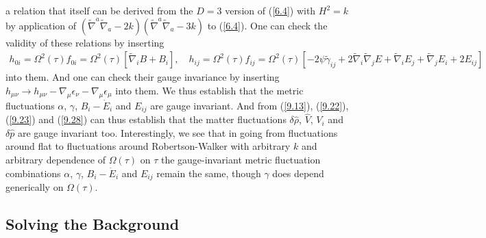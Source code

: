 \documentclass[aps,onecolumn,10pt]{revtex4}
\numberwithin{equation}{section}
\numberwithin{equation}{section}
\begin{document}
%
a relation that itself can be  derived from the $D=3$ version of (\ref{6.4}) with $H^2=k$ by application  of $(\tilde{\nabla}^a\tilde{\nabla}_a-2k)(\tilde{\nabla}^a\tilde{\nabla}_a-3k)$ to (\ref{6.4}). One can check the validity of these relations by inserting 
%
\begin{align}
h_{0i}=\Omega^2(\tau)f_{0i}=\Omega^2(\tau)[\tilde{\nabla}_iB+B_i],\quad h_{ij}=\Omega^2(\tau)f_{ij}=\Omega^2(\tau)[-2\psi\tilde{\gamma}_{ij} +2\tilde{\nabla}_i\tilde{\nabla}_j E + \tilde{\nabla}_i E_j + \tilde{\nabla}_j E_i + 2E_{ij}]
\label{9.48a}
\end{align}
%
into them. And one can check their gauge invariance by inserting $h_{\mu\nu}\rightarrow h_{\mu\nu}-\nabla_{\mu}\epsilon_{\nu}-\nabla_{\mu}\epsilon_{\mu}$ into them. We thus establish that the metric fluctuations $\alpha$, $\gamma$, $B_i-\dot{E}_i$ and $E_{ij}$ are gauge invariant. And from  (\ref{9.13}), (\ref{9.22}), (\ref{9.23}) and (\ref{9.28}) can thus establish that the matter fluctuations $\delta \hat{\rho}$, $\hat{V}$, $V_i$ and $\delta \hat{p}$ are gauge invariant too. Interestingly, we see that in going from fluctuations around flat to fluctuations around Robertson-Walker with arbitrary $k$ and arbitrary dependence of $\Omega(\tau)$ on $\tau$ the gauge-invariant metric fluctuation combinations $\alpha$, $\gamma$, $B_i-\dot{E}_i$ and $E_{ij}$  remain the same, though $\gamma$ does depend generically on $\Omega(\tau)$. 


\subsection{Solving the Background}
\end{document}
